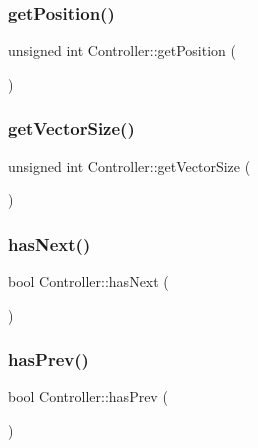 \subsubsection{\texorpdfstring{get\+Position()}{getPosition()}}
{\footnotesize\ttfamily unsigned int Controller\+::get\+Position (\begin{DoxyParamCaption}{ }\end{DoxyParamCaption})}

\mbox{\label{classController_a3d9e63417c55b627ac7d79017f672617_a3d9e63417c55b627ac7d79017f672617}} 
\subsubsection{\texorpdfstring{get\+Vector\+Size()}{getVectorSize()}}
{\footnotesize\ttfamily unsigned int Controller\+::get\+Vector\+Size (\begin{DoxyParamCaption}{ }\end{DoxyParamCaption})}

\mbox{\label{classController_a2c4171f922bf604da9b1db2f9b2b4d15_a2c4171f922bf604da9b1db2f9b2b4d15}} 
\subsubsection{\texorpdfstring{has\+Next()}{hasNext()}}
{\footnotesize\ttfamily bool Controller\+::has\+Next (\begin{DoxyParamCaption}{ }\end{DoxyParamCaption})}

\mbox{\label{classController_ab052ce96b259dc18a6b61506e678ca65_ab052ce96b259dc18a6b61506e678ca65}} 
\subsubsection{\texorpdfstring{has\+Prev()}{hasPrev()}}
{\footnotesize\ttfamily bool Controller\+::has\+Prev (\begin{DoxyParamCaption}{ }\end{DoxyParamCaption})}

